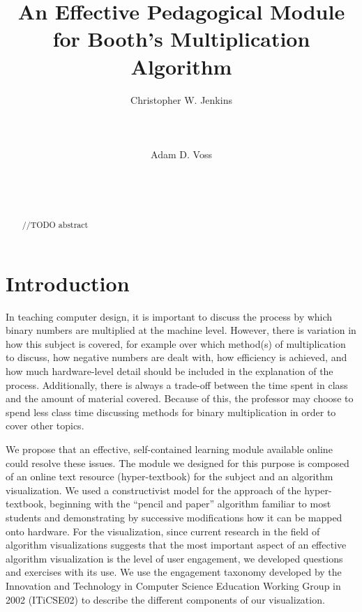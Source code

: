\documentclass{acm_proc_article-sp}
\begin{document}
\title{An Effective Pedagogical Module for Booth's Multiplication Algorithm}

\author{
    \alignauthor
    Christopher W.
Jenkins\\
       \\
       \\
       \\
    \alignauthor
    Adam D.
Voss\\
       \\
       \\
       \\
}

\maketitle

\begin{abstract}
//TODO abstract
\end{abstract}

\section{Introduction}
In teaching computer design, it is important to discuss the process by which binary numbers are multiplied at the machine level.
However, there is variation in how this subject is covered, for example over which method(s) of multiplication to discuss, how negative numbers are dealt with, how efficiency is achieved, and how much hardware-level detail should be included in the explanation of the process.
Additionally, there is always a trade-off between the time spent in class and the amount of material covered.
Because of this, the professor may choose to spend less class time discussing methods for binary multiplication in order to cover other topics.

We propose that an effective, self-contained learning module available online could resolve these issues.
The module we designed for this purpose is composed of an online text resource (hyper-textbook) for the subject and an algorithm visualization.
We used a constructivist model for the approach of the hyper-textbook, beginning with the ``pencil and paper'' algorithm familiar to most students and demonstrating by successive modifications how it can be mapped onto hardware.
For the visualization, since current research in the field of algorithm visualizations suggests that the most important aspect of an effective algorithm visualization is the level of user engagement\cite{tnaps:visengage}, we developed questions and exercises with its use.
We use the engagement taxonomy developed by the Innovation and Technology in Computer Science Education Working Group in 2002 (ITiCSE02) to describe the different components of our visualization.
\end{document}
